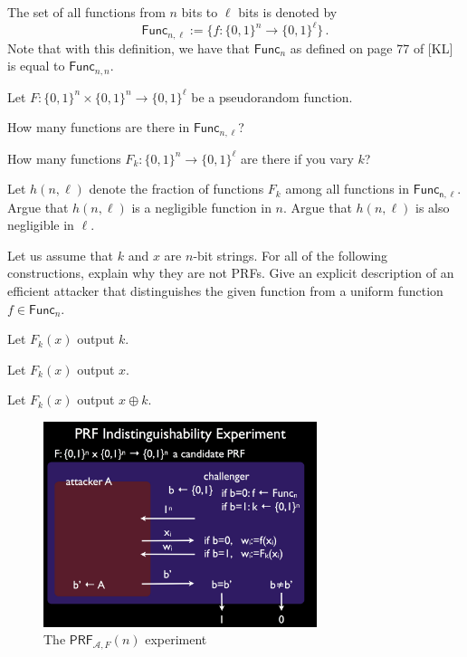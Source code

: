 \documentclass[a4paper,10pt,landscape,twocolumn]{scrartcl}
\begin{document}
\problems


\begin{exercise}
The set of all functions from $n$ bits to $\ell$ bits is denoted by
\[ \mathsf{Func}_{n,\ell} := \big\{f:\{0,1\}^n \rightarrow \{0,1\}^{\ell} \big\} \, .
\]
Note that with this definition, we have that $\mathsf{Func}_n$ as defined on page 77 of [KL] is equal to $\mathsf{Func}_{n,n}$.

Let $F:\{0,1\}^n \times \{0,1\}^n \rightarrow \{0,1\}^\ell$ be a pseudorandom function.

\begin{subex}
How many functions are there in $\mathsf{Func}_{n,\ell}$?
\end{subex}

\begin{subex}
How many functions $F_k:\{0,1\}^n \rightarrow \{0,1\}^\ell$ are there if you vary $k$?
\end{subex}

\begin{subex}
Let $h(n,\ell)$ denote the fraction of functions $F_k$ among all functions in $\mathsf{Func_{n,\ell}}$. Argue that $h(n, \ell)$ is a negligible function in $n$. Argue that $h(n,\ell)$ is also negligible in $\ell$.
\end{subex}

\end{exercise}


\begin{exercise}
Let us assume that $k$ and $x$ are $n$-bit strings. For all of the following constructions, explain why they are not PRFs. Give an explicit description of an efficient attacker that distinguishes the given function from a uniform function $f \in \mathsf{Func}_n$.

\begin{subex}
Let $F_k(x)$ output $k$.
\end{subex}

\begin{subex}
Let $F_k(x)$ output $x$.
\end{subex}

\begin{subex}
Let $F_k(x)$ output $x \oplus k$.
\end{subex}

\end{exercise}


\begin{figure}[h]
\center
\includegraphics[width=8cm]{PRFExperiment.jpg}
\caption{The $\mathsf{PRF}_{\mathcal{A},F}(n)$ experiment \label{fig}}
\end{figure}
\end{document}
